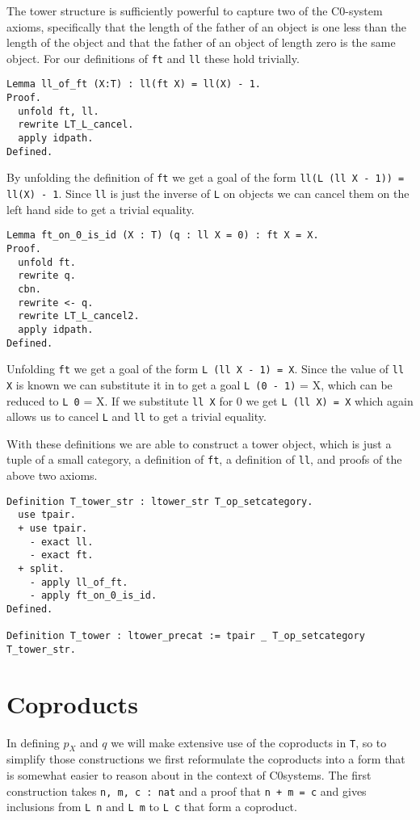 The tower structure is sufficiently powerful to capture two of the C0-system
axioms, specifically that the length of the father of an object is one less than
the length of the object and that the father of an object of length zero is the
same object. For our definitions of \lstinline|ft| and \lstinline|ll| these hold
trivially.
\begin{lstlisting}
Lemma ll_of_ft (X:T) : ll(ft X) = ll(X) - 1.
Proof.
  unfold ft, ll.
  rewrite LT_L_cancel.
  apply idpath.
Defined.
\end{lstlisting}

By unfolding the definition of \lstinline|ft| we get a goal of the form
\lstinline|ll(L (ll X - 1)) = ll(X) - 1|. Since \lstinline|ll| is just the
inverse of \lstinline|L| on objects we can cancel them on the left hand side to
get a trivial equality. 

\begin{lstlisting}
Lemma ft_on_0_is_id (X : T) (q : ll X = 0) : ft X = X.
Proof.
  unfold ft.
  rewrite q.
  cbn.
  rewrite <- q.
  rewrite LT_L_cancel2.
  apply idpath.
Defined.
\end{lstlisting}

Unfolding \lstinline|ft| we get a goal of the form \lstinline|L (ll X - 1) = X|.
Since the value of \lstinline|ll X| is known we can substitute it in to get a
goal \lstinline|L (0 - 1)| = X, which can be reduced to \lstinline|L 0| = X. If
we substitute \lstinline|ll X| for 0 we get \lstinline|L (ll X) = X| which again
allows us to cancel \lstinline|L| and \lstinline|ll| to get a trivial equality.

With these definitions we are able to construct a tower object, which is just a
tuple of a small category, a definition of \lstinline|ft|, a definition of \lstinline|ll|,
and proofs of the above two axioms.
\begin{lstlisting}
Definition T_tower_str : ltower_str T_op_setcategory.
  use tpair.
  + use tpair.
    - exact ll.
    - exact ft.
  + split.
    - apply ll_of_ft.
    - apply ft_on_0_is_id.
Defined.

Definition T_tower : ltower_precat := tpair _ T_op_setcategory T_tower_str.
\end{lstlisting}

\section{Coproducts}
In defining $p_X$ and $q$ we will make extensive use of the coproducts in
\lstinline|T|, so to simplify those constructions we first reformulate the
coproducts into a form that is somewhat easier to reason about in the context of
C0systems. The first construction takes \lstinline|n, m, c : nat| and a proof
that \lstinline|n + m = c| and gives inclusions from \lstinline|L n| and
\lstinline|L m| to \lstinline|L c| that form a coproduct.

